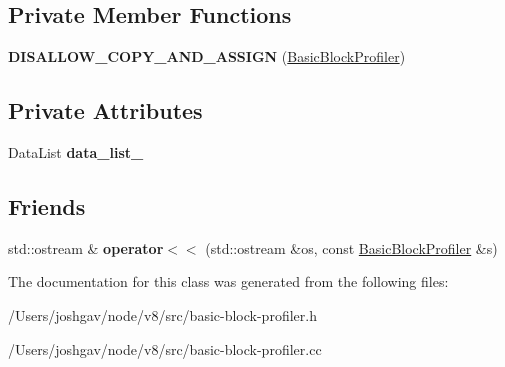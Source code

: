 \subsection*{Private Member Functions}
\begin{DoxyCompactItemize}
\item 
{\bfseries D\+I\+S\+A\+L\+L\+O\+W\+\_\+\+C\+O\+P\+Y\+\_\+\+A\+N\+D\+\_\+\+A\+S\+S\+I\+GN} (\hyperlink{classv8_1_1internal_1_1_basic_block_profiler}{Basic\+Block\+Profiler})\hypertarget{classv8_1_1internal_1_1_basic_block_profiler_af1c4b23692798d960ac8df1d02b1421f}{}\label{classv8_1_1internal_1_1_basic_block_profiler_af1c4b23692798d960ac8df1d02b1421f}

\end{DoxyCompactItemize}
\subsection*{Private Attributes}
\begin{DoxyCompactItemize}
\item 
Data\+List {\bfseries data\+\_\+list\+\_\+}\hypertarget{classv8_1_1internal_1_1_basic_block_profiler_a7f65e8644e75bf8a262cf7b48c68f64e}{}\label{classv8_1_1internal_1_1_basic_block_profiler_a7f65e8644e75bf8a262cf7b48c68f64e}

\end{DoxyCompactItemize}
\subsection*{Friends}
\begin{DoxyCompactItemize}
\item 
std\+::ostream \& {\bfseries operator$<$$<$} (std\+::ostream \&os, const \hyperlink{classv8_1_1internal_1_1_basic_block_profiler}{Basic\+Block\+Profiler} \&s)\hypertarget{classv8_1_1internal_1_1_basic_block_profiler_aaddc40c65cc7294b1b6fee91c092caaf}{}\label{classv8_1_1internal_1_1_basic_block_profiler_aaddc40c65cc7294b1b6fee91c092caaf}

\end{DoxyCompactItemize}


The documentation for this class was generated from the following files\+:\begin{DoxyCompactItemize}
\item 
/\+Users/joshgav/node/v8/src/basic-\/block-\/profiler.\+h\item 
/\+Users/joshgav/node/v8/src/basic-\/block-\/profiler.\+cc\end{DoxyCompactItemize}
